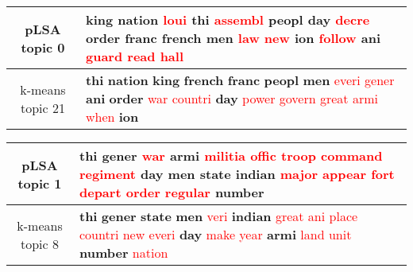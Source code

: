 \begin{center}\begin{tabularx}{\textwidth} {
  | c | >{\raggedright\arraybackslash}X | } \hline 
pLSA topic 0 & \textbf{king} \textbf{nation} \textcolor{red}{loui} \textbf{thi} \textcolor{red}{assembl} \textbf{peopl} \textbf{day} \textcolor{red}{decre} \textbf{order} \textbf{franc} \textbf{french} \textbf{men} \textcolor{red}{law} \textcolor{red}{new} \textbf{ion} \textcolor{red}{follow} \textbf{ani} \textcolor{red}{guard} \textcolor{red}{read} \textcolor{red}{hall} \\ \hline 
k-means topic 21 & \textbf{thi} \textbf{nation} \textbf{king} \textbf{french} \textbf{franc} \textbf{peopl} \textbf{men} \textcolor{red}{everi} \textcolor{red}{gener} \textbf{ani} \textbf{order} \textcolor{red}{war} \textcolor{red}{countri} \textbf{day} \textcolor{red}{power} \textcolor{red}{govern} \textcolor{red}{great} \textcolor{red}{armi} \textcolor{red}{when} \textbf{ion} \\ \hline 
\end{tabularx}

\end{center}

\begin{center}\begin{tabularx}{\textwidth} {
  | c | >{\raggedright\arraybackslash}X | } \hline 
pLSA topic 1 & \textbf{thi} \textbf{gener} \textcolor{red}{war} \textbf{armi} \textcolor{red}{militia} \textcolor{red}{offic} \textcolor{red}{troop} \textcolor{red}{command} \textcolor{red}{regiment} \textbf{day} \textbf{men} \textbf{state} \textbf{indian} \textcolor{red}{major} \textcolor{red}{appear} \textcolor{red}{fort} \textcolor{red}{depart} \textcolor{red}{order} \textcolor{red}{regular} \textbf{number} \\ \hline 
k-means topic 8 & \textbf{thi} \textbf{gener} \textbf{state} \textbf{men} \textcolor{red}{veri} \textbf{indian} \textcolor{red}{great} \textcolor{red}{ani} \textcolor{red}{place} \textcolor{red}{countri} \textcolor{red}{new} \textcolor{red}{everi} \textbf{day} \textcolor{red}{make} \textcolor{red}{year} \textbf{armi} \textcolor{red}{land} \textcolor{red}{unit} \textbf{number} \textcolor{red}{nation} \\ \hline 
\end{tabularx}

\end{center}

